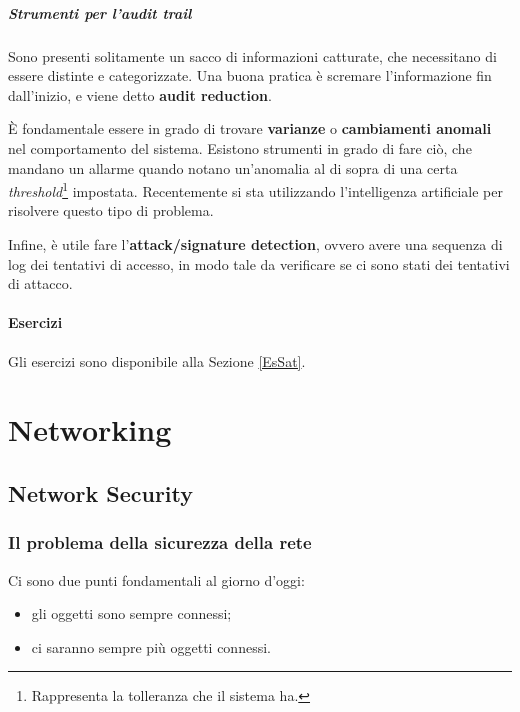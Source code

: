 \subsubsection{Strumenti per l'audit trail}

Sono presenti solitamente un sacco di informazioni catturate, che necessitano
di essere distinte e categorizzate.
Una buona pratica è scremare l'informazione fin dall'inizio, e viene detto
\textbf{audit reduction}.

È fondamentale essere in grado di trovare \textbf{varianze} o \textbf{
cambiamenti anomali} nel comportamento del sistema. Esistono strumenti in
grado di fare ciò, che mandano un allarme quando notano un'anomalia al di
sopra di una certa \textit{threshold}\footnote{Rappresenta la tolleranza che
il sistema ha.} impostata. Recentemente si sta utilizzando l'intelligenza
artificiale per risolvere questo tipo di problema.

Infine, è utile fare l'\textbf{attack/signature detection}, ovvero
avere una sequenza di log dei tentativi di accesso, in modo tale da
verificare se ci sono stati dei tentativi di attacco.

\subsection{Esercizi}

Gli esercizi sono disponibile alla Sezione \ref{EsSat}.


\part{Networking}

\label{net}

\chapter{Network Security}

\section{Il problema della sicurezza della rete}

Ci sono due punti fondamentali al giorno d'oggi:

\begin{itemize}
\item gli oggetti sono sempre connessi;
\item ci saranno sempre più oggetti connessi.
\end{itemize}

